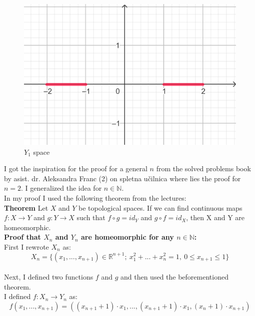 \documentclass[12pt]{article}
\begin{document}
\begin{figure}
	\centering
	\includegraphics[scale=0.20] {graph13}
	\caption{\label{fig:13} $Y_{1}$ space }
\end{figure}

\noindent I got the inspiration for the proof for a general $n$ from the solved problems book by asist. dr. Aleksandra Franc (2) on spletna učilnica where lies the proof for $n=2$. I generalized the idea for $n \in \mathbb{N}$. \\


\noindent In my proof I used the following theorem from the lectures: \\

\noindent \textbf{Theorem} Let $X$ and $Y$ be topological spaces. If we can find continuous maps $f : X \rightarrow Y$ and $g : Y \rightarrow X$ such that $f \circ g = id_{Y}$ and $g \circ f = id_{X}$, then X and Y are homeomorphic. \\

\noindent \textbf{Proof that $X_{n}$ and $Y_{n}$ are homeomorphic for any $n \in \mathbb{N}$:} \\

\noindent First I rewrote $X_{n}$ as: \\
$$X_{n}=\{(x_{1},  ... , x_{n+1}) \in \mathbb{R}^{n+1}; \  x_{1}^2 + ... + x_{n}^2 = 1, \ 0 \leq x_{n+1} \leq 1 \}$$ \\
\noindent Next, I defined two functions $f$ and $g$ and then used the beforementioned theorem.   \\

\noindent I defined $f: X_{n} \rightarrow Y_{n}$ as:  \\
$$f(x_{1},...,x_{n+1}) = ((x_{n+1} + 1) \cdot x_1, ... , (x_{n+1} + 1) \cdot x_1, (x_{n} + 1) \cdot x_{n+1} )$$
\end{document}

